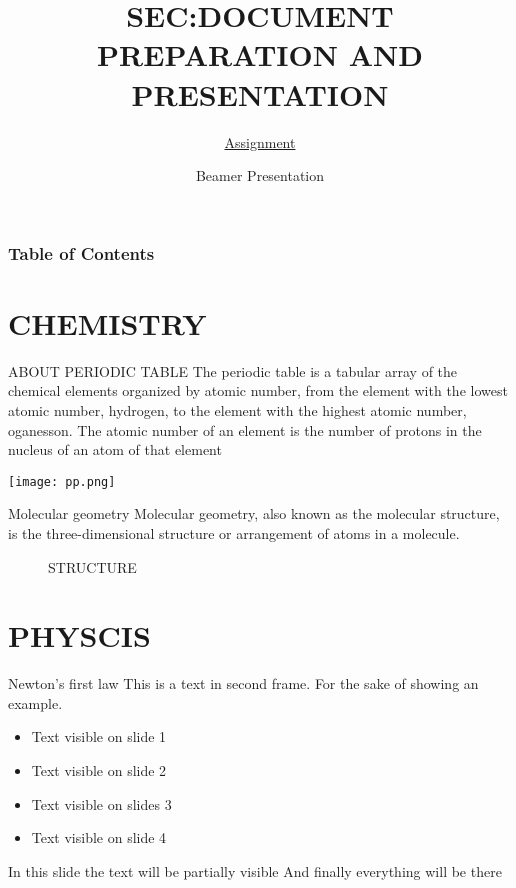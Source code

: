 \documentclass{beamer}
\title[SEC]{\textbf{SEC:DOCUMENT PREPARATION AND PRESENTATION}}
\subtitle{\underline{Assignment}}
\author[Vinay Ruhil]
{Beamer Presentation }
\begin{document}
\frame{\titlepage}
\begin{frame}
\frametitle{Table of Contents}
\tableofcontents
\end{frame}
\section{CHEMISTRY}
\begin{frame}{ABOUT PERIODIC TABLE}
    The periodic table is a tabular array of the chemical elements organized by atomic number, from the element with the lowest atomic number, hydrogen, to the element with the highest atomic number, oganesson. The atomic number of an element is the number of protons in the nucleus of an atom of that element

    \begin{center}
      \texttt{[image: pp.png]}  
    \end{center}
    
\end{frame}
\begin{frame}{Molecular geometry}
    Molecular geometry, also known as the molecular structure, is the three-dimensional structure or arrangement of atoms in a molecule.
    \begin{figure}[h]
     \centering
     \caption{STRUCTURE}
\end{figure}
\end{frame}
\section{PHYSCIS}
\begin{frame}{Newton’s first law}
    This is a text in second frame. For the sake of showing an example.

\begin{itemize}
    \item Text visible on slide 1
    \item Text visible on slide 2
    \item Text visible on slides 3
    \item Text visible on slide 4
\end{itemize}
\end{frame}
\begin{frame}
In this slide \pause
the text will be partially visible \pause
And finally everything will be there
\end{frame}
\end{document}
